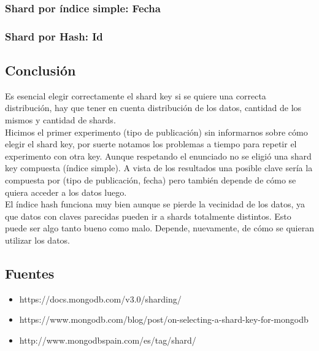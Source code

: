 \newpage
\subsubsection{Shard por índice simple: Fecha}


\newpage
\subsubsection{Shard por Hash: Id}


\newpage
\subsection{Conclusión}

Es esencial elegir correctamente el shard key si se quiere una correcta distribución, hay que tener en cuenta distribución de los datos, cantidad de los mismos y cantidad de shards.\\

Hicimos el primer experimento (tipo de publicación) sin informarnos sobre cómo elegir el shard key, por suerte notamos los problemas a tiempo para repetir el experimento con otra key. Aunque respetando el enunciado no se eligió una shard key compuesta (índice simple). A vista de los resultados una posible clave sería la compuesta por (tipo de publicación, fecha) pero también depende de cómo se quiera acceder a los datos luego.\\

El índice hash funciona muy bien aunque se pierde la vecinidad de los datos, ya que datos con claves parecidas pueden ir a shards totalmente distintos. Esto puede ser algo tanto bueno como malo. Depende, nuevamente, de cómo se quieran utilizar los datos.

\subsection{Fuentes} 
\begin{itemize}
\item 
https://docs.mongodb.com/v3.0/sharding/
\item 
https://www.mongodb.com/blog/post/on-selecting-a-shard-key-for-mongodb
\item 
http://www.mongodbspain.com/es/tag/shard/
\end{itemize}